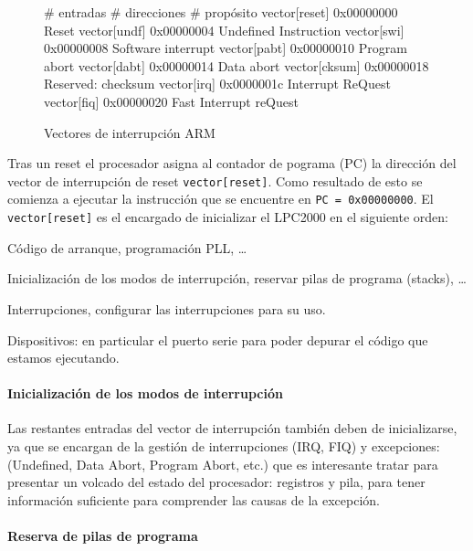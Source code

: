\documentclass[10pt,a4paper]{article}
\newenvironment{itemize*}
        {\begin{itemize}%
                \setlength{\parskip}{2pt}%
                \setlength{\itemsep}{0pt}}
        {\end{itemize}}
\begin{document}
	\begin{figure}[htbp]
	\centering

	\begin{boxedverbatim}
	# entradas      # direcciones  # propósito
	vector[reset]   0x00000000     Reset
	vector[undf]    0x00000004     Undefined Instruction
	vector[swi]     0x00000008     Software interrupt
	vector[pabt]    0x00000010     Program abort
	vector[dabt]    0x00000014     Data abort
	vector[cksum]   0x00000018     Reserved: checksum
	vector[irq]     0x0000001c     Interrupt ReQuest
	vector[fiq]     0x00000020     Fast Interrupt reQuest
	\end{boxedverbatim}
	\caption{Vectores de interrupción ARM}\label{fig:vector}
	\end{figure}
	
	Tras un reset el procesador asigna al contador de pograma (PC) la dirección del vector de interrupción de reset \texttt{vector[reset]}. Como resultado de esto se comienza a ejecutar la instrucción que se encuentre en \texttt{PC = 0x00000000}. El \texttt{vector[reset]} es el encargado de inicializar el LPC2000 en el siguiente orden:
	
	\begin{itemize*}
	\item Código de arranque, programación PLL, \ldots
	\item Inicialización de los modos de interrupción, reservar pilas de programa (stacks), \ldots
	\item Interrupciones, configurar las interrupciones para su uso.
	\item Dispositivos: en particular el puerto serie para poder depurar el código que estamos ejecutando.
	\end{itemize*}
	
	\paragraph{Inicialización de los modos de interrupción}
	
	Las restantes entradas del vector de interrupción también deben de inicializarse, ya que se encargan de la gestión de interrupciones (IRQ, FIQ) y excepciones: (Undefined, Data Abort, Program Abort, etc.) que es interesante tratar para presentar un volcado del estado del procesador: registros y pila, para tener información suficiente para comprender las causas de la excepción.

	\paragraph{Reserva de pilas de programa}
	
\end{document}
